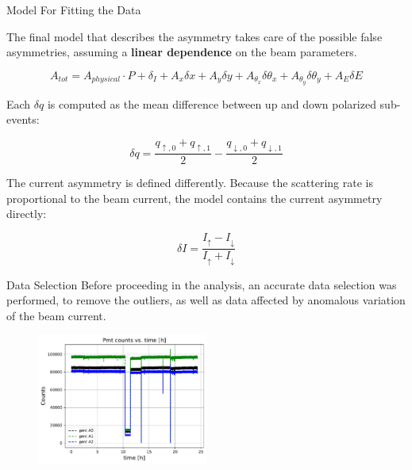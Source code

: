 \documentclass[9pt,a4paper]{beamer}
\begin{document}
\begin{frame}[t]{Model For Fitting the Data}

The final model that describes the asymmetry takes care of the possible false asymmetries, assuming a \textbf{linear dependence} on the beam parameters.

\begin{equation}
A_{tot} = A_{physical} \cdot P + \delta_{I} + A_{x} \delta x + A_{y} \delta y + A_{\theta_{x}} \delta \theta_{x} + A_{\theta_{y}} \delta \theta_{y}+ A_{E} \delta E 
\end{equation}

Each $\delta q$ is computed as the mean difference between up and down polarized sub-events:

\begin{equation}
\delta q = \dfrac{q_{\uparrow,0} + q_{\uparrow,1}}{2} - \dfrac{q_{\downarrow,0} + q_{\downarrow,1}}{2}
\end{equation}

The current asymmetry is defined differently. Because the scattering rate is proportional to the beam current, the model contains the current asymmetry directly:

\begin{equation}
\delta I = \dfrac{I_{\uparrow} - I_{\downarrow}}{I_{\uparrow} + I_{\downarrow}}
\end{equation}

\end{frame}

\begin{frame}{Data Selection}
Before proceeding in the analysis, an accurate data selection was performed, to remove the outliers, as well as data affected by anomalous variation of the beam current.

\begin{figure}
\includegraphics[width = 0.5\textwidth]{figures/BeamExample.pdf}
\end{figure}


\end{frame}
\end{document}
